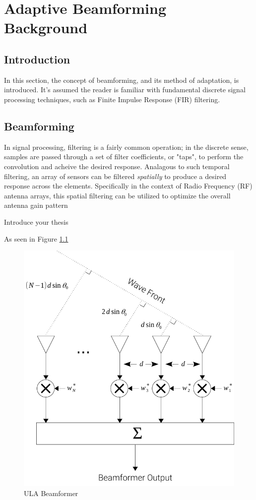 \chapter{Adaptive Beamforming Background}
\label{chap:abf_background}

\section{Introduction}

In this section, the concept of beamforming, and its method of adaptation, is introduced. It's assumed the reader is familiar with fundamental discrete signal processing techniques, such as Finite Impulse Response (FIR) filtering.

\section{Beamforming}

In signal processing, filtering is a fairly common operation; in the discrete sense, samples are passed through a set of filter coefficients, or "taps", to perform the convolution and acheive the desired response. Analagous to such temporal filtering, an array of sensors can be filtered \emph{spatially} to produce a desired response across the elements. Specifically in the context of Radio Frequency (RF) antenna arrays, this spatial filtering can be utilized to optimize the overall antenna gain pattern

Introduce your thesis \citep{Alexander_and_Ghirnikar,Haykin}

As seen in Figure \ref{fig:ula_beamformer}

\begin{figure}[!htbp]
  \centering
  \includegraphics[]{02_abf_background/ula_beamformer}
  \caption{ULA Beamformer}
  \label{fig:ula_beamformer}
\end{figure}

